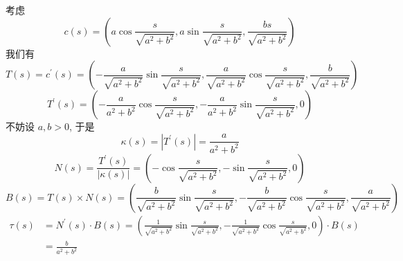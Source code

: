 \documentclass[../../古典微分几何.tex]{subfiles}
\begin{document}
\begin{example}
    考虑 \[
    c\left( s \right)=  \left( a \cos \frac{s }{\sqrt{a^{2}+ b^{2}} }, a\sin \frac{s }{\sqrt{a^{2}+ b^{2}} }  , \frac{bs }{\sqrt{a^{2}+ b^{2}} } \right)  
    \]我们有 \[
    T\left( s \right)= c^{\prime} \left( s \right)= \left( - \frac{a }{\sqrt{a^{2}+ b^{2}} }\sin  \frac{s }{\sqrt{a^{2}+ b^{2}} }, \frac{a }{\sqrt{a^{2}+ b^{2}} } \cos  \frac{s }{\sqrt{a^{2}+ b^{2}} }, \frac{b }{\sqrt{a^{2}+ b^{2}} }      \right)   
    \] \[
    T^{\prime} \left( s \right)=  \left( - \frac{a }{a^{2}+ b^{2} } \cos  \frac{s }{\sqrt{a^{2}+ b^{2}} }, - \frac{a }{a^{2}+ b^{2} } \sin \frac{s }{\sqrt{a^{2}+ b^{2}} }, 0     \right)  
    \]不妨设 \(  a,b>0  \), 于是 \[
     \kappa  \left( s \right)= \left| T^{\prime} \left( s \right)  \right|=  \frac{a }{a^{2}+ b^{2} }   
    \] \[
    N\left( s \right)=  \frac{T^{\prime} \left( s \right)  }{\left|  \kappa  \left( s \right)  \right|  }=  \left( -\cos  \frac{s }{\sqrt{a^{2}+ b^{2}} }, -\sin  \frac{s }{\sqrt{a^{2}+ b^{2}} }, 0   \right)   
    \] \[
    B\left( s \right)= T\left( s \right)\times N\left( s \right)= \left( \frac{b }{\sqrt{a^{2}+ b^{2}} }\sin \frac{s }{\sqrt{a^{2}+ b^{2}} } , - \frac{b }{\sqrt{a^{2}+ b^{2}} } \cos  \frac{s }{\sqrt{a^{2}+ b^{2}} }, \frac{a }{\sqrt{a^{2}+ b^{2}} }      \right)    
    \] \[
 \begin{aligned}
    \tau \left( s \right)& = N^{\prime} \left( s \right)\cdot B\left( s \right)=  \left( \frac{1 }{\sqrt{a^{2}+ b^{2}} }\sin  \frac{s }{\sqrt{a^{2}+ b^{2}} },- \frac{1}{\sqrt{a^{2}+ b^{2}}}   \cos \frac{s }{\sqrt{a^{2}+ b^{2}} } , 0\right)\cdot B\left( s \right)     \\ 
    & =  \frac{b }{a^{2}+ b^{2} }  
 \end{aligned}
    \]
\end{example}

\hspace*{\fill} 
  
\end{document}
